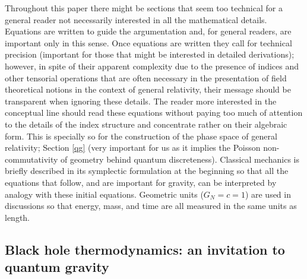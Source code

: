 \documentclass[aps, nofootinbib,superscriptaddress,12pt]{revtex4-2}
\begin{document}
Throughout this paper there might be sections that seem too technical for a general reader not necessarily  interested in all the mathematical details.  Equations are written to guide the argumentation and, for general readers, are important only in this sense. 
Once equations are written they call for technical precision (important for those that might be interested in detailed derivations); however, in spite of their apparent complexity due to the presence of indices and other tensorial operations that are often necessary in the presentation of field theoretical notions in the context of general relativity, their message should be transparent when ignoring these details. The reader more interested in the conceptual line  should read these equations without paying too much of attention to the details of the index structure and concentrate rather on their algebraic form. This is specially so for the construction of the phase space of general relativity; Section \ref{qg} (very important for us as it implies the Poisson non-commutativity of geometry behind quantum discreteness). Classical mechanics is briefly described in its symplectic formulation at the beginning so that all the equations that follow, and are important for gravity, can be interpreted by analogy with these initial equations.  Geometric units ($G_N=c=1$) are used in discussions so that energy, mass, and time are all measured in the same units as length.
 
\subsection{Black hole thermodynamics: an invitation to quantum gravity} \label{twoty}
\end{document}
